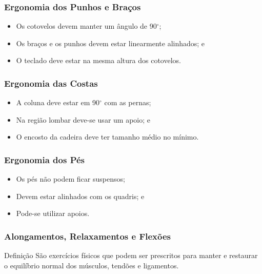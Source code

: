 \documentclass[aspectratio=169]{beamer} %
\begin{document}
\begin{frame}
	\frametitle{Ergonomia dos Punhos e Braços}
	
	\begin{itemize}
		\item Os cotovelos devem manter um ângulo de 90$^{\circ}$;
		\item Os braços e os punhos devem estar linearmente alinhados; e
		\item O teclado deve estar na mesma altura dos cotovelos.
	\end{itemize}
\end{frame}

\begin{frame}
	\frametitle{Ergonomia das Costas}
	
	\begin{itemize}
		\item A coluna deve estar em 90$^{\circ}$ com as pernas;
		\item Na região lombar deve-se usar um apoio; e
		\item O encosto da cadeira deve ter tamanho médio no mínimo.
	\end{itemize}
\end{frame}

\begin{frame}
	\frametitle{Ergonomia dos Pés}
	
	\begin{itemize}
		\item Os pés não podem ficar suspensos;
		\item Devem estar alinhados com os quadris; e
		\item Pode-se utilizar apoios. 
	\end{itemize}
\end{frame}

\begin{frame}
	\frametitle{Alongamentos, Relaxamentos e Flexões}
	
	\begin{block}{Defini\c cão}
		São exercícios físicos que podem ser prescritos para manter e restaurar o equilíbrio normal dos músculos, tendões e ligamentos.
	\end{block}
\end{frame}
\end{document}
